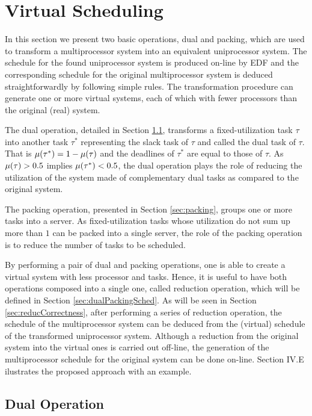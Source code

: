 \documentclass[twocolumn, compsocconf]{IEEEtran}
\newcounter{proc}
\begin{document}
\section{Virtual Scheduling}\label{sec:virtualSched}

In this section we present two basic operations, dual and packing, which are
used to transform a multiprocessor system into an equivalent uniprocessor
system. The schedule for the found uniprocessor system is produced on-line by
EDF and the corresponding schedule for the original multiprocessor system is
deduced straightforwardly by following simple rules. The transformation
procedure can generate one or more virtual systems, each of which with fewer
processors than the original (real) system.

The dual operation, detailed in Section \ref{sec:dualSched}, transforms a
fixed-utilization task $\tau$ into another task $\tau^*$ representing the slack
task of $\tau$ and called the dual task of $\tau$. That is $\mu(\tau^*) = 1 -
\mu(\tau)$ and the deadlines of $\tau^*$ are equal to those of $\tau$. As
$\mu(\tau) > 0.5$ implies $\mu(\tau^*) < 0.5$, the dual operation plays the
role of reducing the utilization of the system made of complementary dual tasks
as compared to the original system.

The packing operation, presented in Section \ref{sec:packing}, groups one or
more tasks into a server. As fixed-utilization tasks whose utilization do not
sum up more than $1$ can be packed into a single server, the role of the packing
operation is to reduce the number of tasks to be scheduled.

By performing a pair of dual and packing operations, one is able to create a
virtual system with less processor and tasks. Hence, it is useful to have both
operations composed into a single one, called reduction operation, which will be
defined in Section \ref{sec:dualPackingSched}. As will be seen in Section
\ref{sec:reducCorrectness}, after performing a series of reduction operation,
the schedule of the multiprocessor system can be deduced from the (virtual)
schedule of the transformed uniprocessor system. Although a reduction from the
original system into the virtual ones is carried out off-line, the generation of
the multiprocessor schedule for the original system can be done on-line.
Section IV.E ilustrates the proposed approach with an example.

\subsection{Dual Operation}\label{sec:dualSched}
\end{document}
